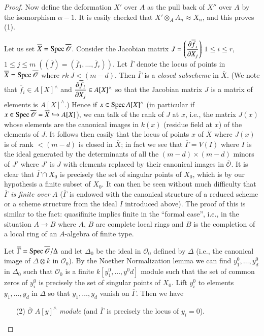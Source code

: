 \begin{proof}
Now define the deformation $X'$ over $A$ as the pull back of $X''$
over $A$ by the isomorphism $\alpha-1$. It is easily checked that
$X'\otimes_{A}A_{n}\approx X_{n}$, and this proves (1).

Let us set $\overline{X} = \operatorname{Spec} \overline{\mathscr{O}}$. Consider the
Jacobian matrix $J = \left(\dfrac{\partial \overline{f}_{i}}{\partial X_{j}}\right)$
\;\; $1\leq i\leq r$,\pageoriginale $1\leq j\leq m \; 
((\overline{f})=(\overline{f}_{1},\ldots,\overline{f}_{r}))$. Let
$\overline{\Gamma}$ denote the locus of points in $\overline{X}=\operatorname{Spec}
\overline{\mathscr{O}}$ where $rk\ J<(m-d)$. Then $\overline{\Gamma}$
is a {\em closed subscheme} in $\overline{X}$. (We note that
$\overline{f}_{i}\in A[X]^{\wedge}$ and $\dfrac{\partial \overline{f}_{i}}{\partial
  X_{j}}\in A[X]^{\wedge}$ so that the Jacobian matrix $J$ is a matrix of
elements is $A[X]^{\wedge}$.) Hence if $x\in\operatorname{Spec} A[X]^{\wedge}$ (in
particular if $x\in \operatorname{Spec}
\overline{\mathscr{O}}=\overline{X}\hookrightarrow A[X]$), we can talk
of the rank of $J$ at $x$, i.e., the matrix $J(x)$ whose elements are
the canonical images in $k(x)$ (residue field at $x$) of the elements
of $J$. It follows then easily that the locus of points $x$ of
$\overline{X}$ where $J(x)$ is of rank $<(m-d)$ is closed in
$\overline{X}$; in fact we see that $\overline{\Gamma}=V(I)$ where $I$
is the ideal generated by the determinants of all the $(m-d)\times
(m-d)$ minors of $J'$ where $J'$ is $J$ with elements replaced by
their canonical images in $\overline{\mathscr{O}}$. It is clear that
$\overline{\Gamma}\cap X_{0}$ is precisely the set of singular points of
$X_{0}$, which is by our hypothesis a finite subset of $X_{0}$. It can
then be seen without much difficulty that $\overline{\Gamma}$ {\em is
  finite over} $A$ ($\overline{\Gamma}$ is endowed with the canonical
structure of a reduced scheme or a scheme structure from the ideal $I$
introduced above). The proof of this is similar to the fact:
quasifinite implies finite in the ``formal case'', i.e., in the
situation $A\to B$ where $A$, $B$ are complete local rings and $B$ is
the completion of a local ring of an $A$-algebra of finite type.

Let $\overline{\Gamma}=\operatorname{Spec} \overline{\mathscr{O}}/\Delta$ and let
$\Delta_{0}$ be the ideal in $\mathscr{O}_{0}$ defined by $\Delta$
(i.e., the canonical image of $\Delta \otimes k$ in
$\mathscr{O}_{0}$). By the Noether Normalization lemma we can find
$y^{0}_{1},\ldots,y^{0}_{d}$ in $\Delta_{0}$ such that
$\mathscr{O}_{0}$ is a finite $k[y^{0}_{1},\ldots,y^{0}d]$ module such
that the set of common zeros of $y^{0}_{i}$ is precisely the set of
singular points of $X_{0}$. Lift $y^{0}_{i}$ to elements
$y_{1},\ldots,y_{d}$ in $\Delta$ so that $y_{1},\ldots,y_{d}$ vanish
on $\overline{\Gamma}$. Then we have 
\begin{itemize}
\item[(2)] $\overline{\mathscr{O}}$
  $A[y]^{\wedge}$ {\em module} (and $\overline{\Gamma}$ is precisely the
  locus of $y_{i}=0$).
\end{itemize}


\end{proof}
